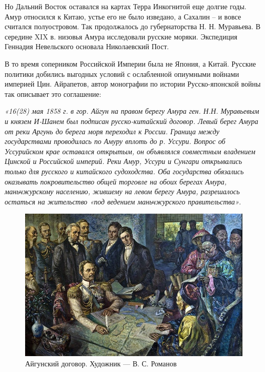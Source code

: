 Но Дальний Восток оставался на картах Терра Инкогнитой еще долгие годы. Амур относился к Китаю, устье его не было изведано, а Сахалин – и вовсе считался полуостровом. Так продолжалось до губернаторства Н. Н. Муравьева. В середине XIX в. низовья Амура исследовали русские моряки. Экспедиция Геннадия Невельского основала Николаевский Пост.

В то время соперником Российской Империи была не Япония, а Китай. Русские политики добились выгодных условий с ослабленной опиумными войнами империей Цин. Айрапетов, автор монографии по истории Русско-японской войны так описывает это соглашение: 
\begin{textcitation}
\textit{«16(28) мая 1858 г. в гор. Айгун на правом берегу Амура ген. Н.Н. Муравьевым и князем И-Шанем был подписан русско-китайский договор. Левый берег Амура от реки Аргунь до берега моря переходил к России. Граница между государствами проводилась по Амуру вплоть до р. Уссури. Вопрос об Уссурийском крае оставался открытым, он объявлялся совместным владением Цинской и Российской империй. Реки Амур, Уссури и Сунгари открывались только для русского и китайского судоходства. Оба государства обязались оказывать покровительство общей торговле на обоих берегах Амура, маньчжурскому населению, жившему на левом берегу Амура, разрешалось остаться на жительство «под ведением маньчжурского правительства»}.
\end{textcitation}

\begin{figure}[h!tb] 
	\centering\includegraphics[scale=0.5]{Data/RYAV_predposylki/wvyqo2RYUXU.jpg}
	\caption{Айгунский договор. Художник — В. С. Романов
	}%
\end{figure}

